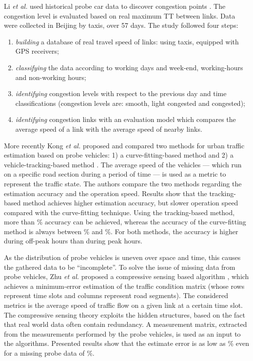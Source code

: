 \documentclass[10pt,onecolumn]{article}
\begin{document}
Li \textit{et al.} used historical probe car data to discover congestion points \cite{Li2009}. The congestion level is evaluated based on real maximum TT between links. Data were collected in Beijing by  taxis, over 57 days. The study followed four steps: 
\begin{enumerate}
\item \textit{building} a database of real travel speed of links: using  taxis, equipped with GPS receivers;
\item \textit{classifying} the data according to working days and week-end, working-hours and non-working hours;
\item \textit{identifying} congestion levels with respect to the previous day and time classifications (congestion levels are: smooth, light congested and congested);
\item \textit{identifying} congestion links with an evaluation model which compares the average speed of a link with the average speed of nearby links.
\end{enumerate}

More recently Kong \textit{et al.} proposed and compared two methods for urban traffic estimation based on probe vehicles: 1) a curve-fitting-based method and 2) a vehicle-tracking-based method \cite{Kong2013}. 
The average speed of the vehicles --- which run on a specific road section during a period of time --- is used as a metric to represent the traffic state.
The authors compare the two methods regarding the estimation accuracy and the operation speed.
Results show that the tracking-based method achieves higher estimation accuracy, but slower operation speed compared with the curve-fitting technique. Using the tracking-based method, more than \% accuracy can be achieved, whereas the accuracy of the curve-fitting method is always between \% and \%. For both methods, the accuracy is higher during off-peak hours than during peak hours.

As the distribution of probe vehicles is uneven over space and time, this causes the gathered data to be ``incomplete''. To solve the issue of missing data from probe vehicles, Zhu \textit{et al.} proposed a compressive sensing based algorithm \cite{Zhu2013}, which achieves a minimum-error estimation of the traffic condition matrix (whose rows represent time slots and columns represent road segments). The considered metrics is the average speed of traffic flow on a given link at a certain time slot. The compressive sensing theory exploits the hidden structures, based on the fact that real world data often contain redundancy. A measurement matrix, extracted from the measurements performed by the probe vehicles, is used as an input to the algorithms. Presented results show that the estimate error is as low as \% even for a missing probe data of \%.
\end{document}
